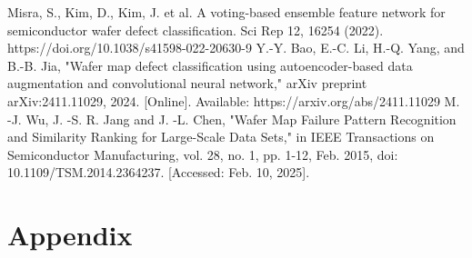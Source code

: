 \documentclass[conference]{IEEEtran}
\begin{document}
\begin{thebibliography}{00}
 Misra, S., Kim, D., Kim, J. et al. A voting-based ensemble feature network for semiconductor wafer defect classification. Sci Rep 12, 16254 (2022). https://doi.org/10.1038/s41598-022-20630-9
 Y.-Y. Bao, E.-C. Li, H.-Q. Yang, and B.-B. Jia, "Wafer map defect classification using autoencoder-based data augmentation and convolutional neural network," arXiv preprint arXiv:2411.11029, 2024. [Online]. Available: https://arxiv.org/abs/2411.11029
 M. -J. Wu, J. -S. R. Jang and J. -L. Chen, "Wafer Map Failure Pattern Recognition and Similarity Ranking for Large-Scale Data Sets," in IEEE Transactions on Semiconductor Manufacturing, vol. 28, no. 1, pp. 1-12, Feb. 2015, doi: 10.1109/TSM.2014.2364237. [Accessed: Feb. 10, 2025].

\end{thebibliography}

\newpage
\onecolumn
\appendix
\section{Appendix}

\end{document}
